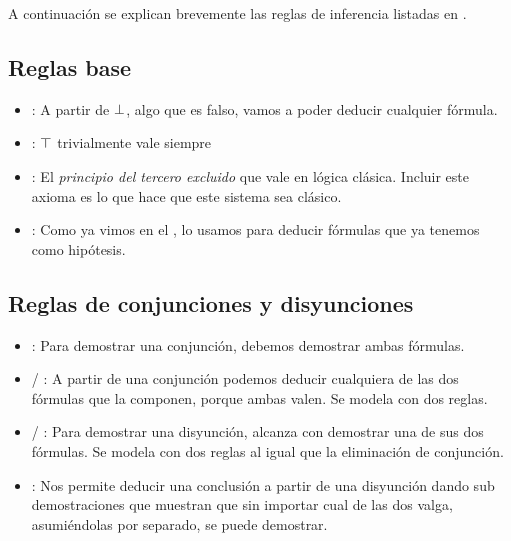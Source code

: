 A continuación se explican brevemente las reglas de inferencia listadas en .

\subsection{Reglas base}

\begin{multicols}{2}
    \proofTreeFalseE
    \proofTreeTrueI
\end{multicols}

\begin{multicols}{2}
    \proofTreeLEM
    \proofTreeAx
\end{multicols}

\begin{itemize}
    \item {}: A partir de $\bot$, algo que es falso, vamos a poder deducir cualquier
    fórmula.
    \item {}: $\top$ trivialmente vale siempre
    \item {}: El \textit{principio del tercero excluido} que vale en
    lógica clásica. Incluir este axioma es lo que hace que este sistema sea
    clásico.
    \item {}: Como ya vimos en el , lo usamos para
    deducir fórmulas que ya tenemos como hipótesis.
\end{itemize}

\subsection{Reglas de conjunciones y disyunciones}

\proofTreeAndI

\begin{multicols}{2}
    \proofTreeAndEOne
    \proofTreeAndETwo
\end{multicols}

\begin{multicols}{2}
    \proofTreeOrIOne
    \proofTreeOrITwo
\end{multicols}

\proofTreeOrE

\begin{itemize}
    \item {}: Para demostrar una conjunción, debemos demostrar ambas fórmulas.
    \item {} / : A partir de una conjunción podemos
    deducir cualquiera de las dos fórmulas que la componen, porque ambas valen.
    Se modela con dos reglas.
    \item {} / : Para demostrar una disyunción, alcanza con
    demostrar una de sus dos fórmulas. Se modela con dos reglas al igual que la
    eliminación de conjunción.
    \item {}: Nos permite deducir una conclusión a partir de una
    disyunción dando sub demostraciones que muestran que sin importar cual de
    las dos valga, asumiéndolas por separado, se puede demostrar.
\end{itemize}

